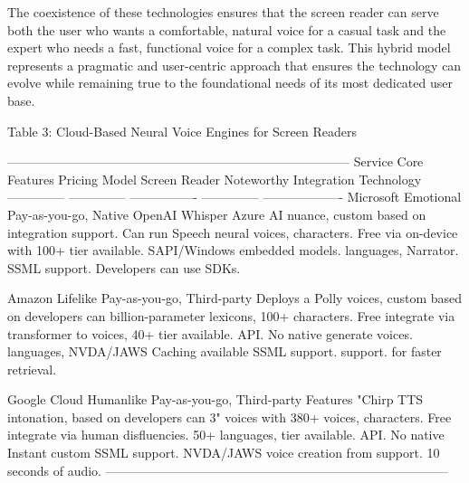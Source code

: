 The coexistence of these technologies ensures that the screen reader can
serve both the user who wants a comfortable, natural voice for a casual
task and the expert who needs a fast, functional voice for a complex
task. This hybrid model represents a pragmatic and user-centric approach
that ensures the technology can evolve while remaining true to the
foundational needs of its most dedicated user base.

Table 3: Cloud-Based Neural Voice Engines for Screen Readers

  ---------------------------------------------------------------------------------
  Service        Core Features  Pricing Model    Screen Reader  Noteworthy
                                                 Integration    Technology
  -------------- -------------- ---------------- -------------- -------------------
  Microsoft    Emotional      Pay-as-you-go,   Native         OpenAI Whisper
  Azure AI       nuance, custom based on         integration    support. Can run
  Speech       neural voices, characters. Free via            on-device with
                 100+           tier available.  SAPI/Windows   embedded models.
                 languages,                      Narrator.      
                 SSML support.                   Developers can 
                                                 use SDKs.      

  Amazon       Lifelike       Pay-as-you-go,   Third-party    Deploys a
  Polly        voices, custom based on         developers can billion-parameter
                 lexicons, 100+ characters. Free integrate via  transformer to
                 voices, 40+    tier available.  API. No native generate voices.
                 languages,                      NVDA/JAWS      Caching available
                 SSML support.                   support.       for faster
                                                                retrieval.

  Google Cloud Humanlike      Pay-as-you-go,   Third-party    Features "Chirp
  TTS          intonation,    based on         developers can 3" voices with
                 380+ voices,   characters. Free integrate via  human disfluencies.
                 50+ languages, tier available.  API. No native Instant custom
                 SSML support.                   NVDA/JAWS      voice creation from
                                                 support.       10 seconds of
                                                                audio.
  ---------------------------------------------------------------------------------

